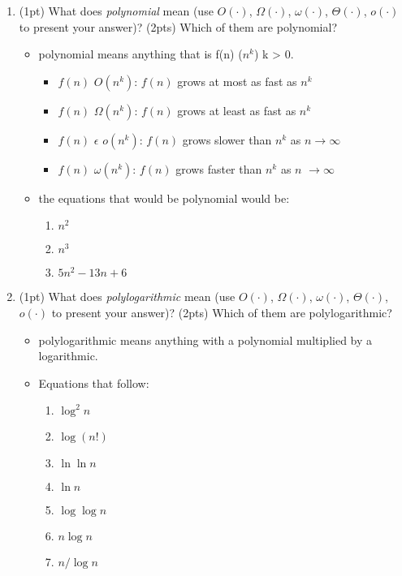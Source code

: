 \documentclass{article}[12pt]
\newcommand\encircle[1]{\raisebox{.5pt}{\textcircled{\raisebox{-.9pt} {\footnotesize #1}}} }
\begin{document}
\begin{enumerate}[label=(\arabic*)]
  \item (1pt) What does \emph{polynomial} mean (use $O(\cdot)$, $\Omega(\cdot)$, $\omega(\cdot)$, $\Theta(\cdot)$, $o(\cdot)$ to present your answer)? (2pts) Which of them are polynomial?
    \begin{itemize}
      \item polynomial means anything that is f(n) \epsilon  \Theta($n^k$) k > 0.
        \begin{itemize}
          \item $f(n)$ \epsilon $O(n^k)$: $f(n)$ grows at most as fast as $n^k$
          \item $f(n)$ \epsilon $\Omega(n^k)$: $f(n)$ grows at least as fast as $n^k$
          \item $f(n)$ $\epsilon$  $o(n^k)$: $f(n)$ grows slower than $n^k$ as $n \rightarrow \infty$
          \item $f(n)$ \epsilon $\omega(n^k)$: $f(n)$ grows faster than $n^k$ as $n$ $\rightarrow \infty$
        \end{itemize}
      \item the equations that would be polynomial would be:
\begin{center}
\begin{multicols}{4}
\begin{enumerate}[label=\encircle{\arabic*}]
  \item $n^2$
  \item $n^3$
  \item $5n^2-13n+6$
\end{enumerate}
\end{multicols}
\end{center}
    \end{itemize}

  \item (1pt) What does \emph{polylogarithmic} mean (use $O(\cdot)$, $\Omega(\cdot)$, $\omega(\cdot)$, $\Theta(\cdot)$, $o(\cdot)$ to present your answer)? (2pts) Which of them are polylogarithmic?
    \begin{itemize}
      \item polylogarithmic means anything with a polynomial
        multiplied by a logarithmic.
      \item Equations that follow:
\begin{center}
\begin{multicols}{4}
\begin{enumerate}[label=\encircle{\arabic*}]
  \item $\log^2n$
  \item $\log(n!)$
  \item $\ln\ln n$
  \item $\ln n$
  \item $\log \log n$
  \item $n\log n$
  \item $n/\log n$
\end{enumerate}
\end{multicols}
\end{center}


\end{itemize}
\end{enumerate}
\end{document}
